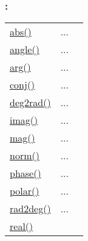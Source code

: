 \subsubsection*{: }

\textcolor{blue}{}\begin{tabular}{>{\raggedleft}p{3cm}>{\centering}p{0.5cm}l}
\textcolor{blue}{\hyperlink{abs}{abs()}}&
...&
 \begin{NoHyper} \nameref{par:Absolute-value} \end{NoHyper}\tabularnewline
\textcolor{blue}{\hyperlink{angle}{angle()}}&
...&
 \begin{NoHyper} \nameref{par:angle} \end{NoHyper}\tabularnewline
\textcolor{blue}{\hyperlink{arg}{arg()}}&
...&
 \begin{NoHyper} \nameref{par:arg} \end{NoHyper}\tabularnewline
\textcolor{blue}{\hyperlink{conj}{conj()}}&
...&
 \begin{NoHyper} \nameref{par:Conjugate} \end{NoHyper}\tabularnewline
\textcolor{blue}{\hyperlink{deg2rad}{deg2rad()}}&
...&
 \begin{NoHyper} \nameref{par:deg2rad} \end{NoHyper}\tabularnewline
\textcolor{blue}{\hyperlink{imag}{imag()}}&
...&
 \begin{NoHyper} \nameref{par:Imag} \end{NoHyper}\tabularnewline
\textcolor{blue}{\hyperlink{mag}{mag()}}&
...&
 \begin{NoHyper} \nameref{par:Magnitude} \end{NoHyper}\tabularnewline
\textcolor{blue}{\hyperlink{norm}{norm()}}&
...&
 \begin{NoHyper} \nameref{par:norm} \end{NoHyper}\tabularnewline
\textcolor{blue}{\hyperlink{phase}{phase()}}&
...&
 \begin{NoHyper} \nameref{par:Phase} \end{NoHyper}\tabularnewline
\textcolor{blue}{\hyperlink{polar}{polar()}}&
...&
 \begin{NoHyper} \nameref{par:polar} \end{NoHyper}\tabularnewline
\textcolor{blue}{\hyperlink{rad2deg}{rad2deg()}}&
...&
 \begin{NoHyper} \nameref{par:rad2deg} \end{NoHyper}\tabularnewline
\textcolor{blue}{\hyperlink{real}{real()}}&

\end{tabular}
